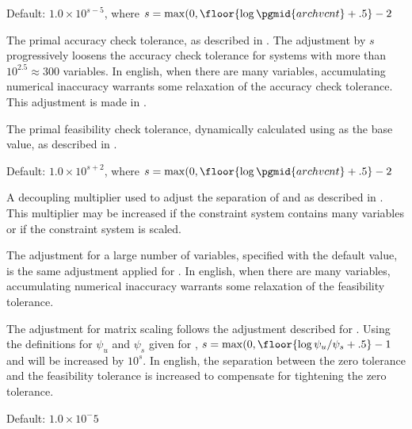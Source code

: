 \begin{codedoc}
  \item{}
    \kw{;}

  Default: $1.0 \times 10^{s-5}$,
      where $s = \max (0, \floor{\log \pgmid{archvcnt} + .5}-2$

  The primal accuracy check tolerance, as described in .
  The adjustment by $s$ progressively loosens the accuracy check tolerance
  for systems with more than $10^{2.5} \approx 300$ variables.
  In english, when there are many variables, accumulating numerical inaccuracy
  warrants some relaxation of the accuracy check tolerance.
  This adjustment is made in .

  \item{}

  The primal feasibility check tolerance, dynamically calculated using
   as the base value, as described in .

  \item{}
    \kw{;}

  Default: $1.0 \times 10^{s+2}$, 
      where $s = \max (0, \floor{\log \pgmid{archvcnt} + .5}-2$

  A decoupling multiplier used to adjust the separation of 
  and  as described in .
  This multiplier may be increased if the constraint system contains many
  variables or if the constraint system is scaled.

  The adjustment for a large number of variables, specified with the default
  value, is the same adjustment applied for .
  In english, when there are many variables, accumulating numerical inaccuracy
  warrants some relaxation of the feasibility tolerance.

  The adjustment for matrix scaling follows the adjustment described for
  .
  Using the definitions for $\psi_u$ and $\psi_s$ given for ,
  $s = \max (0, \floor{\log \psi_u/\psi_s + .5}-1$
  and  will be increased by $10^s$.
  In english, the separation between the zero tolerance and the feasibility
  tolerance is increased to compensate for tightening the zero tolerance.

  \item{}
    \kw{;}

  Default: $1.0 \times 10^-5$


\end{codedoc}
